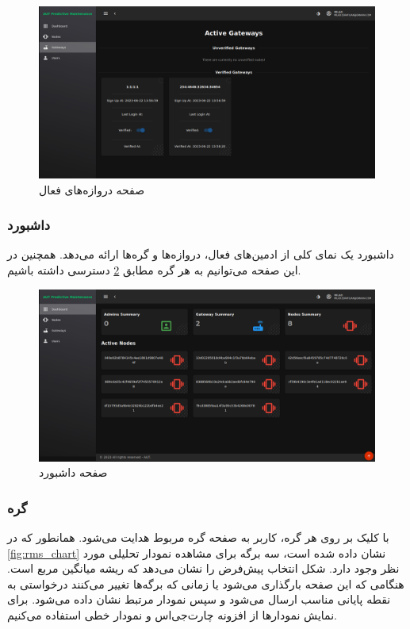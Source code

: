 \begin{figure}[!h]
\centering\includegraphics[scale=.38]{gateway_page.png}
\caption{صفحه دروازه‌های فعال}\label{fig:gateway_page}
\end{figure}

\subsubsection{داشبورد}

داشبورد یک نمای کلی از ادمین‌های فعال، دروازه‌ها و گره‌ها ارائه می‌دهد. همچنین در این صفحه می‌توانیم به هر گره مطابق \cref{fig:dashboard} دسترسی داشته باشیم.

\begin{figure}[!h]
\centering\includegraphics[scale=.38]{dashboard.png}
\caption{صفحه داشبورد}\label{fig:dashboard}
\end{figure}

\subsubsection{گره}

با کلیک بر روی هر گره، کاربر به صفحه گره مربوط هدایت می‌شود. همانطور که در \cref{fig:rms_chart} نشان داده شده است، سه برگه برای مشاهده نمودار تحلیلی مورد نظر وجود دارد. شکل انتخاب پیش‌فرض را نشان می‌دهد که ریشه میانگین مربع است. هنگامی که این صفحه بارگذاری می‌شود یا زمانی که برگه‌ها تغییر می‌کنند درخواستی به نقطه پایانی مناسب ارسال می‌شود و سپس نمودار مرتبط نشان داده می‌شود. برای نمایش نمودارها از افزونه چارت‌جی‌اس و نمودار خطی استفاده می‌کنیم.

